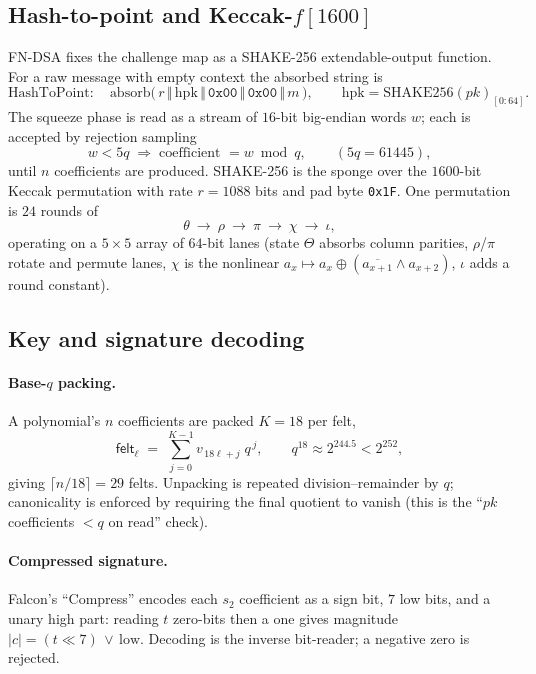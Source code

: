 \documentclass[11pt]{article}
\newcommand{\HtP}{\mathrm{HashToPoint}}
\begin{document}
\subsection{Hash-to-point and Keccak-\texorpdfstring{$f[1600]$}{f1600}}
FN-DSA fixes the challenge map as a SHAKE-256 extendable-output function. For a raw message
with empty context the absorbed string is
\begin{equation}
  \HtP:\quad \text{absorb}\bigl(\,r \,\Vert\, \mathrm{hpk} \,\Vert\, \texttt{0x00} \,\Vert\, \texttt{0x00} \,\Vert\, m\,\bigr),
  \qquad \mathrm{hpk}=\mathrm{SHAKE256}(pk)_{[0:64]} .
  \label{eq:framing}
\end{equation}
The squeeze phase is read as a stream of $16$-bit big-endian words $w$; each is accepted by
rejection sampling
\begin{equation}
  w < 5q \;\Rightarrow\; \text{coefficient } = w \bmod q, \qquad (5q=61445),
\end{equation}
until $n$ coefficients are produced. SHAKE-256 is the sponge over the $1600$-bit Keccak
permutation with rate $r=1088$ bits and pad byte \texttt{0x1F}. One permutation is
$24$ rounds of
\[
  \theta\ \to\ \rho\ \to\ \pi\ \to\ \chi\ \to\ \iota,
\]
operating on a $5\times5$ array of $64$-bit lanes (state $\Theta$ absorbs column parities,
$\rho$/$\pi$ rotate and permute lanes, $\chi$ is the nonlinear
$a_{x}\!\mapsto\! a_x\oplus(\overline{a_{x+1}}\wedge a_{x+2})$, $\iota$ adds a round constant).

\subsection{Key and signature decoding}
\paragraph{Base-$q$ packing.} A polynomial's $n$ coefficients are packed $K{=}18$ per felt,
\begin{equation}
  \mathsf{felt}_\ell \;=\; \sum_{j=0}^{K-1} v_{\,18\ell+j}\;q^{\,j},
  \qquad q^{18}\approx 2^{244.5} < 2^{252},
\end{equation}
giving $\lceil n/18\rceil = 29$ felts. Unpacking is repeated division--remainder by $q$;
canonicality is enforced by requiring the final quotient to vanish (this is the
``$pk$ coefficients $<q$ on read'' check).

\paragraph{Compressed signature.} Falcon's ``Compress'' encodes each $s_2$ coefficient as a
sign bit, $7$ low bits, and a unary high part: reading $t$ zero-bits then a one gives
magnitude $|c| = (t\ll 7)\,\lor\,\text{low}$. Decoding is the inverse bit-reader; a negative
zero is rejected.
\end{document}

